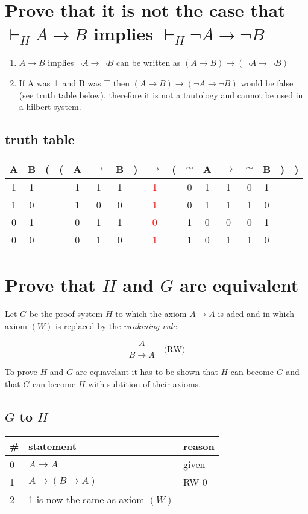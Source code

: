 \documentclass{article}
\begin{document}
\section{Prove that it is not the case that $\vdash_H A \to B$ implies 
$ \vdash_H \neg A \to \neg B$}

\begin{enumerate}
	\item $A \to B$ implies $\neg A \to \neg B$ can be written as 
		$(A \to B) \to (\neg A \to \neg B)$
	\item If A was $\bot$ and B was $\top$ then $(A \to B) \to (\neg A \to 
		\neg B)$ would be false (see truth table below), therefore it is not a tautology and cannot
		be used in a hilbert system.
\end{enumerate}
\subsection{truth table}
\begin{tabular}{@{ }c@{ }@{ }c | c@{}@{}c@{}@{ }c@{ }@{ }c@{ }@{ }c@{ }@{}c@{}@{ }c@{ }@{}c@{}@{ }c@{ }@{ }c@{ }@{ }c@{ }@{ }c@{ }@{ }c@{ }@{}c@{}@{}c@{ }}
A & B & ( & ( & A & $\rightarrow$ & B & ) & $\rightarrow$ & ( & $\sim$ & A & $\rightarrow$ & $\sim$ & B & ) & )\\
\hline 
1 & 1 &  &  & 1 & 1 & 1 &  & \textcolor{red}{1} &  & 0 & 1 & 1 & 0 & 1 &  & \\
1 & 0 &  &  & 1 & 0 & 0 &  & \textcolor{red}{1} &  & 0 & 1 & 1 & 1 & 0 &  & \\
0 & 1 &  &  & 0 & 1 & 1 &  & \textcolor{red}{0} &  & 1 & 0 & 0 & 0 & 1 &  & \\
0 & 0 &  &  & 0 & 1 & 0 &  & \textcolor{red}{1} &  & 1 & 0 & 1 & 1 & 0 &  & \\
\end{tabular}

\section{Prove that $H$ and $G$ are equivalent}
Let $G$ be the proof system $H$ to which the axiom $A \to A$ 
is aded and in which axiom $(W)$ is replaced by the \emph{weakining rule}

\[\frac{A}{B \to A}\quad\text{(RW)} \]


To prove $H$ and $G$ are equavelant it has to be shown that $H$ can become
$G$ and that $G$ can become $H$ with subtition of their axioms.

\subsection{$G$ to $H$}
\begin{tabular}{@{}l|ll@{}}
\#& statement			&reason \\ \toprule
0& $A \to A$ & given \\
1& $A \to (B \to A)$ &  RW 0 \\
2& 1 is now the same as axiom $(W)$
\end{tabular}
\end{document}
